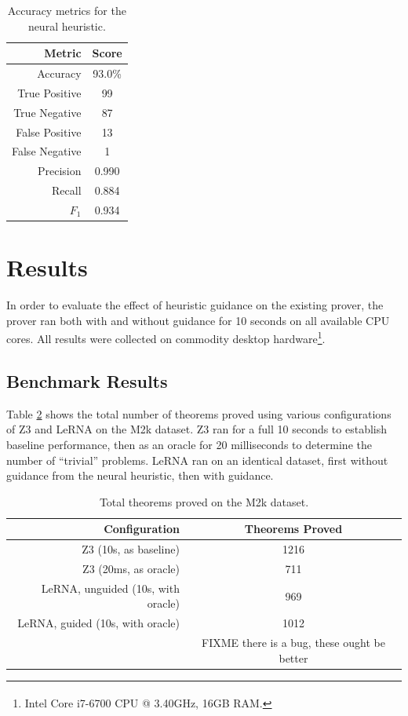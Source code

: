 \documentclass[runningheads]{llncs}
\newcommand{\z}[1]{\textsc{Z3}}
\begin{document}
\begin{table}
	\caption{Accuracy metrics for the neural heuristic.}
	\centering
	\begin{tabular}{r | c}
		\textbf{Metric} & \textbf{Score}\\
		\hline
		Accuracy & 93.0\%\\
		True Positive&99\\
		True Negative&87\\
		False Positive&13\\
		False Negative&1\\
		Precision&0.990\\
		Recall&0.884\\
		\(F_1\)&0.934\\
	\end{tabular}
	\label{table:network-evaluation}
\end{table}

\section{Results}
\label{section:results}
In order to evaluate the effect of heuristic guidance on the existing prover, the prover ran both with and without guidance for 10 seconds on all available CPU cores.
All results were collected on commodity desktop hardware\footnote{Intel\textsuperscript{\textregistered} Core\textsuperscript{\texttrademark} i7-6700 CPU @ 3.40GHz, 16GB RAM.}.

\subsection{Benchmark Results}
Table \ref{table:m2k-results} shows the total number of theorems proved using various configurations of \z3 and LeRNA on the M2k dataset.
\z3 ran for a full 10 seconds to establish baseline performance, then as an oracle for 20 milliseconds to determine the number of ``trivial'' problems.
LeRNA ran on an identical dataset, first without guidance from the neural heuristic, then with guidance.

\begin{table}
	\caption{Total theorems proved on the M2k dataset.}
	\centering
	\begin{tabular}{r | c}
		\textbf{Configuration} & \textbf{Theorems Proved}\\
		\hline
		\z3 (10s, as baseline) & 1216\\
		\z3 (20ms, as oracle) & 711\\
		LeRNA, unguided (10s, with oracle) & 969\\
		LeRNA, guided (10s, with oracle) & 1012\\
						      & FIXME there is a bug, these ought be better\\
	\end{tabular}
	\label{table:m2k-results}
\end{table}
\end{document}
